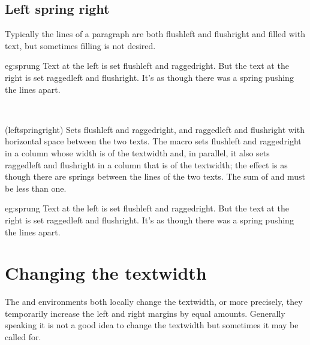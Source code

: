 \subsection{Left spring right}

    Typically the lines of a paragraph are both flushleft and flushright and
filled with text, but sometimes filling is not desired.

\begin{egresult}{eg:sprung}
%
  {Text at the left is set flushleft and raggedright.}
  {But the text at the right is set raggedleft and flushright.
   It's as though there was a spring pushing the lines apart.}
\vspace*{0.25\baselineskip}
\end{egresult}


\begin{syntax}
\cmd{\leftspringright} \\
\end{syntax}
\glossary(leftspringright)%
  {}%
  {Sets  flushleft and raggedright, and  raggedleft
   and flushright with horizontal space between the two texts.}
The \cmd{\leftspringright} macro sets  flushleft and raggedright
in a column whose width is  of the textwidth and, in parallel,
it also sets  raggedleft and flushright in a column that is
 of the textwidth; the effect is as though there are springs 
between the lines of the two texts. The sum of  and  
must be less than one.

\begin{egsource}{eg:sprung}
%
  {Text at the left is set flushleft and raggedright.}
  {But the text at the right is set raggedleft and flushright.
   It's as though there was a spring pushing the lines apart.}
\end{egsource}

\section{Changing the textwidth}\label{sec:adjustwidth}

    The  and  environments both locally change the 
textwidth, or more precisely, they temporarily increase the left and right 
margins by equal amounts. 
Generally speaking it is not a 
good idea to change the textwidth but sometimes it may be called for.

